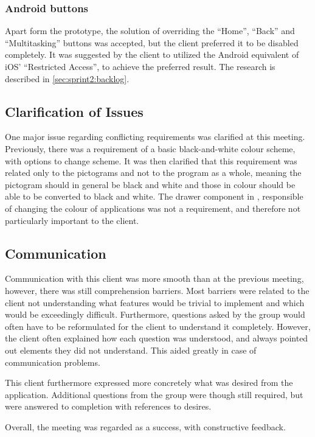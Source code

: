 \subsubsection{Android buttons}
Apart form the prototype, the solution of overriding the ``Home'', ``Back'' and ``Multitasking'' buttons was accepted, but the client preferred it to be disabled completely.
It was suggested by the client to utilized the Android equivalent of iOS' ``Restricted Access'', to achieve the preferred result.
The research is described in \cref{sec:sprint2:backlog}.

\subsection{Clarification of Issues}\label{sec:sprint2:clarification}
One major issue regarding conflicting requirements was clarified at this meeting.
Previously, there was a requirement of a basic black-and-white colour scheme, with options to change scheme.
It was then clarified that this requirement was related only to the pictograms and not to the program as a whole, meaning the pictogram should in general be black and white and those in colour should be able to be converted to black and white.
The drawer component in \launcher, responsible of changing the colour of applications was not a requirement, and therefore not particularly important to the client.

\subsection{Communication}
Communication with this client was more smooth than at the previous meeting, however, there was still comprehension barriers.
Most barriers were related to the client not understanding what features would be trivial to implement and which would be exceedingly difficult.
Furthermore, questions asked by the group would often have to be reformulated for the client to understand it completely.
However, the client often explained how each question was understood, and always pointed out elements they did not understand.
This aided greatly in case of communication problems.

This client furthermore expressed more concretely what was desired from the application.
Additional questions from the group were though still required, but were answered to completion with references to desires.

Overall, the meeting was regarded as a success, with constructive feedback.
